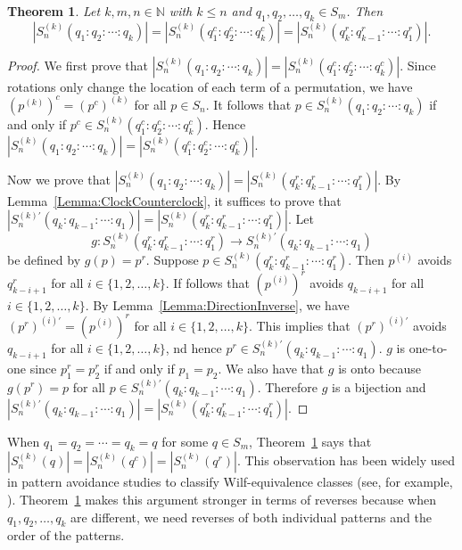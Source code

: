 \documentclass[10pt,a4paper]{amsart}
\newtheorem{theorem}{Theorem}[section]
\numberwithin{equation}{section}
\begin{document}
\begin{theorem}\label{Theorem:ComplementReverse}
Let $k,m,n\in\mathbb{N}$ with $k\leq n$ and $q_1,q_2,\ldots,q_k\in S_m$. Then
    \[
    |S_n^{(k)}(q_1:q_2:\cdots:q_k)|=|S_n^{(k)}(q_1^c:q_2^c:\cdots:q_k^c)|=|S_n^{(k)}(q_k^r:q_{k-1}^r:\cdots:q_1^r)|.
    \]
\end{theorem}

\begin{proof}
We first prove that $|S_n^{(k)}(q_1:q_2:\cdots:q_k)|=|S_n^{(k)}(q_1^c:q_2^c:\cdots:q_k^c)|$. Since rotations only change the location of each term of a permutation, we have $\left(p^{(k)}\right)^c=\left(p^c\right)^{(k)}$ for all $p\in S_n$. It follows that $p\in S_n^{(k)}(q_1:q_2:\cdots:q_k)$ if and only if $p^c\in S_n^{(k)}(q_1^c:q_2^c:\cdots:q_k^c)$. Hence $|S_n^{(k)}(q_1:q_2:\cdots:q_k)|=|S_n^{(k)}(q_1^c:q_2^c:\cdots:q_k^c)|$.

Now we prove that $|S_n^{(k)}(q_1:q_2:\cdots:q_k)|=|S_n^{(k)}(q_k^r:q_{k-1}^r:\cdots:q_1^r)|$. By Lemma~\ref{Lemma:ClockCounterclock}, it suffices to prove that $|S_n^{(k)'}(q_k:q_{k-1}:\cdots:q_1)|=|S_n^{(k)}(q_k^r:q_{k-1}^r:\cdots:q_1^r)|$. Let \[g:S_n^{(k)}(q_k^r:q_{k-1}^r:\cdots:q_1^r)\to S_n^{(k)'}(q_k:q_{k-1}:\cdots:q_1)\] 
be defined by 
$g(p)=p^r$. Suppose $p\in S_n^{(k)}(q_k^r:q_{k-1}^r:\cdots:q_1^r)$. Then $p^{(i)}$ avoids $q_{k-i+1}^r$ for all $i\in\{1,2,\ldots,k\}$. If follows that $(p^{(i)})^r$ avoids $q_{k-i+1}$ for all $i\in\{1,2,\ldots,k\}$. By Lemma~\ref{Lemma:DirectionInverse}, we have $(p^r)^{(i)'}=(p^{(i)})^r$ for all $i\in\{1,2,\ldots,k\}$. This implies that $(p^r)^{(i)'}$ avoids $q_{k-i+1}$ for all $i\in\{1,2,\ldots,k\}$, nd 
hence  $p^r\in S_n^{(k)'}(q_k:q_{k-1}:\cdots:q_1)$. $g$ is one-to-one since  $p_1^r=p_2^r$ if and only if $p_1=p_2$. We also have that $g$ is onto because $g(p^r)=p$ for all $p\in S_n^{(k)'}(q_k:q_{k-1}:\cdots:q_1)$. 
Therefore $g$ is a bijection and $|S_n^{(k)'}(q_k:q_{k-1}:\cdots:q_1)|=|S_n^{(k)}(q_k^r:q_{k-1}^r:\cdots:q_1^r)|$.
\end{proof}

When $q_1=q_2=\cdots=q_k=q$ for some $q\in S_m$, Theorem~\ref{Theorem:ComplementReverse} says that $|S_n^{(k)}(q)|=|S_n^{(k)}(q^c)|=|S_n^{(k)}(q^r)|$. This observation has been widely used in pattern avoidance studies to classify Wilf-equivalence classes (see, for example, \cite[p.~151]{Bona2022}). Theorem~\ref{Theorem:ComplementReverse} 
makes this argument stronger in terms of reverses because when $q_1,q_2,\ldots,q_k$ are different, we need reverses of both individual patterns and the order of the patterns.
\end{document}
